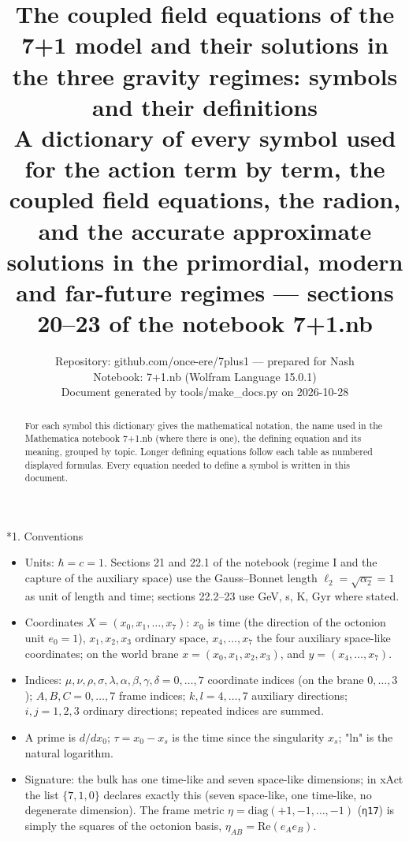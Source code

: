 \documentclass[10pt,a4paper]{article}
\makeatletter
\renewcommand\section{\@startsection{section}{1}{\z@}{-3.5ex \@plus -1ex \@minus -.2ex}{2.3ex \@plus.2ex}{\normalfont\Large\bfseries\raggedright}}
\makeatother
\begin{document}
\title{The coupled field equations of the 7+1 model and their solutions in the three gravity regimes: symbols and their definitions\\[0.4em]\large A dictionary of every symbol used for the action term by term, the coupled field equations, the radion, and the accurate approximate solutions in the primordial, modern and far-future regimes — sections 20–23 of the notebook 7+1.nb}
\author{Repository: github.com/once-ere/7plus1 — prepared for Nash\\ Notebook: 7+1.nb (Wolfram Language 15.0.1)\\ Document generated by tools/make\_docs.py on 2026-10-28}
\date{}
\maketitle
\begin{abstract}
For each symbol this dictionary gives the mathematical notation, the name used in the Mathematica notebook 7+1.nb (where there is one), the defining equation and its meaning, grouped by topic. Longer defining equations follow each table as numbered displayed formulas. Every equation needed to define a symbol is written in this document.
\end{abstract}
\tableofcontents
{}\section*{1. Conventions}
\begin{itemize}
\item Units: $\hbar=c=1$. Sections 21 and 22.1 of the notebook (regime I and the capture of the auxiliary space) use the Gauss–Bonnet length $\ell_2=\sqrt{\alpha_2}=1$ as unit of length and time; sections 22.2–23 use GeV, s, K, Gyr where stated.
\item Coordinates $X=(x_0,x_1,\dots,x_7)$: $x_0$ is time (the direction of the octonion unit $e_0=1$), $x_1,x_2,x_3$ ordinary space, $x_4,\dots,x_7$ the four auxiliary space-like coordinates; on the world brane $x=(x_0,x_1,x_2,x_3)$, and $y=(x_4,\dots,x_7)$.
\item Indices: $\mu,\nu,\rho,\sigma,\lambda,\alpha,\beta,\gamma,\delta=0,\dots,7$ coordinate indices (on the brane $0,\dots,3$); $A,B,C=0,\dots,7$ frame indices; $k,l=4,\dots,7$ auxiliary directions; $i,j=1,2,3$ ordinary directions; repeated indices are summed.
\item A prime is $d/dx_0$; $\tau=x_0-x_s$ is the time since the singularity $x_s$; "ln" is the natural logarithm.
\item Signature: the bulk has one time-like and seven space-like dimensions; in xAct the list $\{7,1,0\}$ declares exactly this (seven space-like, one time-like, no degenerate dimension). The frame metric $\eta=\mathrm{diag}(+1,-1,\dots,-1)$ (\texttt{η17}) is simply the squares of the octonion basis, $\eta_{AB}=\mathrm{Re}(e_Ae_B)$.
\end{itemize}
\end{document}
